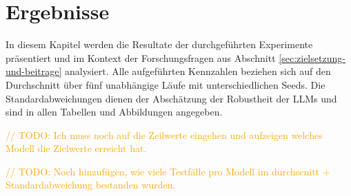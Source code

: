 \chapter{Ergebnisse}\label{ch:ergebnisse}

In diesem Kapitel werden die Resultate der durchgeführten Experimente präsentiert und im Kontext der Forschungsfragen aus Abschnitt \ref{sec:zielsetzung-und-beitrage} analysiert. Alle aufgeführten Kennzahlen beziehen sich auf den Durchschnitt über fünf unabhängige Läufe mit unterschiedlichen Seeds. Die Standardabweichungen dienen der Abschätzung der Robustheit der \acp{LLM} und sind in allen Tabellen und Abbildungen angegeben.

\textcolor{orange}{// TODO: Ich muss noch auf die Zeilwerte eingehen und aufzeigen welches Modell die Zielwerte erreicht hat.}

\textcolor{orange}{// TODO: Noch hinzufügen, wie viele Testfälle pro Modell im durchscnitt + Standardabweichung bestanden wurden.}






